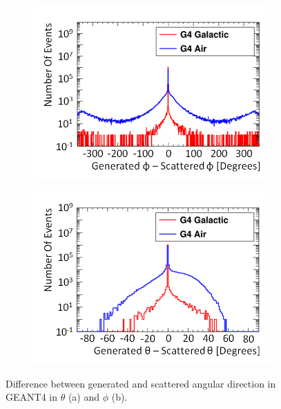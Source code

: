 \begin{figure}[!h]
\centering
\begin{subfigure}{.5\textwidth}
  \centering
  \includegraphics[width=\linewidth]{Chapter4/Figs/Raster/CryPlots/genPhi-scatPhiMedText.png}
  \captionsetup{width=.9\linewidth}
  \caption{}
  \label{subFig:genPhi-scatPhi}
\end{subfigure}%
\begin{subfigure}{.5\textwidth}
  \centering
  \includegraphics[width=\linewidth]{Chapter4/Figs/Raster/CryPlots/genTheta-scatThetaMedText.png}
  \captionsetup{width=.9\linewidth}
  \caption{}
  \label{subFig:genTheta-scatPhi}
\end{subfigure}
\caption{Difference between generated and scattered angular direction in GEANT4 in $\theta$ (a) and $\phi$ (b).}
\label{fig:gen-scat_PhiTheta}
\end{figure}

